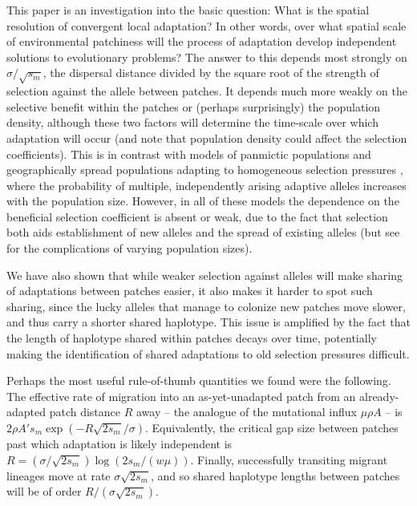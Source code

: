 \documentclass{article}
\newcommand{\linelabel}[1]{}
\newcommand{\citep}[1]{\cite{#1}}
\newcommand{\citet}[1]{\cite{#1}}
\begin{document}
This paper is an investigation into the basic question: 
What is the spatial resolution of convergent local adaptation?
In other words, 
over what spatial scale of environmental patchiness will the process
of adaptation develop independent solutions to evolutionary problems?
The answer to this depends most strongly on $\sigma/\sqrt{s_m}$, 
the dispersal distance divided by the square root of the strength of selection against the allele between patches. 
It depends much more weakly on the
selective benefit within the patches or (perhaps surprisingly) the population density, 
although these two factors will determine the time-scale over which adaptation will occur
(and note that population density could affect the selection coefficients). \linelabel{rr:popdensity}
This is in contrast with models of panmictic populations
\citep{softsweepsI, MesserPetrov, wilson2014selective} 
and geographically spread populations adapting to homogeneous selection pressures \citep{ralph2010parallel}, 
where the probability of multiple, independently arising adaptive alleles increases with the population size.
However, in all of these models the dependence on the beneficial selection
coefficient is absent or weak, due to the fact that selection both
aids establishment of new alleles and the spread of existing
alleles (but see \citet{wilson2014selective} for the complications of varying population sizes). 

We have also shown that
while weaker selection against alleles will make sharing 
of adaptations between patches easier, 
it also makes it harder to spot such sharing,
since the lucky alleles that manage to colonize new patches move slower,
and thus carry a shorter shared haplotype.
This issue is amplified by the fact that the length of haplotype
shared within patches decays over time, potentially making the
identification of shared adaptations to old selection pressures difficult.

Perhaps the most useful rule-of-thumb quantities we found were the following.
The effective rate of migration into an as-yet-unadapted patch from an already-adapted patch distance $R$ away 
-- the analogue of the mutational influx $\mu \rho A$ --
is $2 \rho A' s_m \exp(- R \sqrt{2 s_m} / \sigma)$.
Equivalently, the critical gap size between patches past which adaptation is likely independent
is $R = (\sigma/\sqrt{2s_m}) \log(2s_m/(w \mu))$.
Finally, successfully transiting migrant lineages move at rate $\sigma \sqrt{2s_m}$,
and so shared haplotype lengths between patches will be of order $R/(\sigma \sqrt{2s_m})$.
\end{document}
